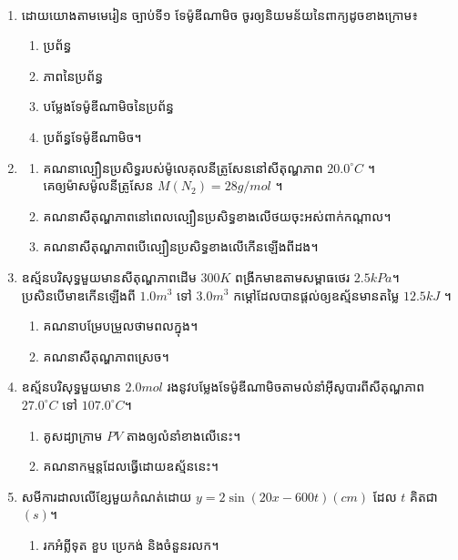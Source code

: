 \documentclass{officialexam}
\begin{document}
\maketitle\\
\begin{enumerate}[I]
	\item ដោយយោងតាមមេរៀន ច្បាប់ទី១ ទែម៉ូឌីណាមិច ចូរឲ្យនិយមន័យនៃពាក្យដូចខាងក្រោម៖ 
	\begin{enumerate}[k,2]
		\item ប្រព័ន្ធ
		\item ភាពនៃប្រព័ន្ធ
		\item បម្លែងទែម៉ូឌីណាមិចនៃប្រព័ន្ធ
		\item ប្រព័ន្ធទែម៉ូឌីណាមិច។
	\end{enumerate}
	\item \begin{enumerate}[m]
		\item គណនាល្បឿនប្រសិទ្ធរបស់ម៉ូលេគុលនីត្រូសែននៅសីតុណ្ហភាព $20.0^\circ C$ ។\\ គេឲ្យម៉ាសម៉ូលនីត្រូសែន $M\left(N_2\right)=28g/mol$ ។
		\item គណនាសីតុណ្ហភាពនៅពេលល្បឿនប្រសិទ្ធខាងលើថយចុះអស់ពាក់កណ្តាល។
		\item គណនាសីតុណ្ហភាពបើល្បឿនប្រសិទ្ធខាងលើកើនឡើងពីដង។
	\end{enumerate}
	\item ឧស្ម័នបរិសុទ្ធមួយមានសីតុណ្ហភាពដើម $300K$ ពង្រីកមាឌតាមសម្ពាធថេរ $2.5kPa$។ \\ប្រសិនបើមាឌកើនឡើងពី $1.0m^3$ ទៅ $3.0m^3$ កម្តៅដែលបានផ្តល់ឲ្យឧស្ម័នមានតម្លៃ $12.5kJ$ ។
	\begin{enumerate}[k,2]
		\item គណនាបម្រែបម្រួលថាមពលក្នុង។
		\item គណនាសីតុណ្ហភាពស្រេច។
	\end{enumerate}
	\item ឧស្ម័នបរិសុទ្ធមួយមាន $2.0mol$ រងនូវបម្លែងទែម៉ូឌីណាមិចតាមលំនាំអុីសូបារពីសីតុណ្ហភាព $27.0^\circ C$ ទៅ $107.0^\circ C$។
	\begin{enumerate}[k,2]
		\item គូសដ្យាក្រាម $PV$ តាងឲ្យលំនាំខាងលើនេះ។
		\item គណនាកម្មន្តដែលធ្វើដោយឧស្ម័ននេះ។
	\end{enumerate}
	\item សមីការដាលលើខ្សែមួយកំណត់ដោយ $y=2\sin\left(20x-600t\right)\left(cm\right)$ ដែល $t$ គិតជា $(s)$។
	\begin{enumerate}[k,2]
		\item រកអំព្លីទុត ខួប ប្រេកង់ និងចំនួនរលក។

\end{enumerate}
\end{enumerate}
\end{document}
